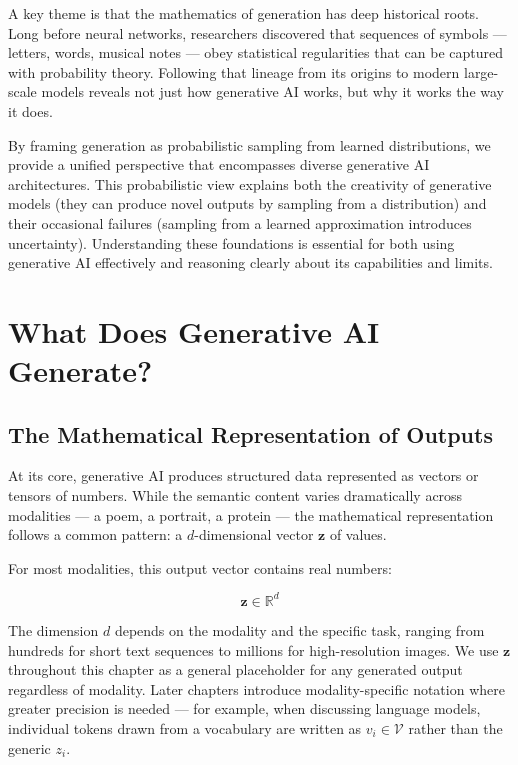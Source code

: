 \documentclass{book}
\begin{document}
A key theme is that the mathematics of generation has deep historical roots.
Long before neural networks, researchers discovered that sequences of symbols ---
letters, words, musical notes --- obey statistical regularities that can be
captured with probability theory. Following that lineage from its origins to
modern large-scale models reveals not just how generative AI works, but why it
works the way it does.

By framing generation as probabilistic sampling from learned distributions, we
provide a unified perspective that encompasses diverse generative AI
architectures. This probabilistic view explains both the creativity of generative
models (they can produce novel outputs by sampling from a distribution) and their
occasional failures (sampling from a learned approximation introduces
uncertainty). Understanding these foundations is essential for both using
generative AI effectively and reasoning clearly about its capabilities and limits.

\section{What Does Generative AI Generate?}

\subsection{The Mathematical Representation of Outputs}

At its core, generative AI produces structured data represented as vectors or
tensors of numbers. While the semantic content varies dramatically across
modalities --- a poem, a portrait, a protein --- the mathematical representation
follows a common pattern: a $d$-dimensional vector $\mathbf{z}$ of values.

For most modalities, this output vector contains real numbers:

\begin{equation}
\mathbf{z} \in \mathbb{R}^d
\end{equation}

The dimension $d$ depends on the modality and the specific task, ranging from
hundreds for short text sequences to millions for high-resolution images. We use
$\mathbf{z}$ throughout this chapter as a general placeholder for any generated
output regardless of modality. Later chapters introduce modality-specific
notation where greater precision is needed --- for example, when discussing
language models, individual tokens drawn from a vocabulary are written as
$v_i \in \mathcal{V}$ rather than the generic $z_i$.
\end{document}
